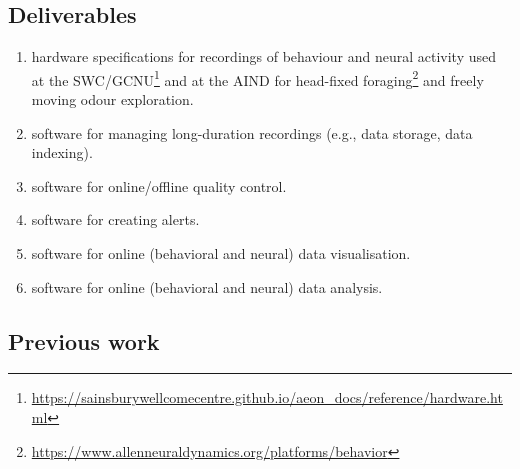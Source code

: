 \subsection{Deliverables}

\begin{enumerate}

    \item hardware specifications for recordings of behaviour and neural
        activity used at the
        SWC/GCNU\footnote{\url{https://sainsburywellcomecentre.github.io/aeon\_docs/reference/hardware.html}}
        and at the AIND for head-fixed
        foraging\footnote{\url{https://www.allenneuraldynamics.org/platforms/behavior}}
        and freely moving odour exploration.

    \item software for managing long-duration recordings (e.g., data storage, data
        indexing).

    \item software for online/offline quality control.

    \item software for creating alerts.

    \item software for online (behavioral and neural) data visualisation.

    \item software for online (behavioral and neural) data analysis.

\end{enumerate}

\subsection{Previous work}

